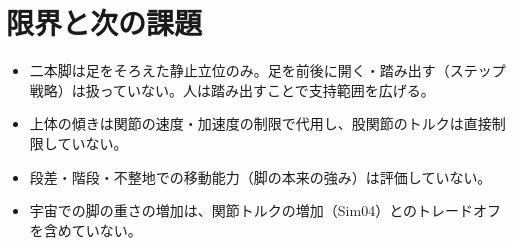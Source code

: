 \section{限界と次の課題}

\begin{itemize}
\tightlist
\item
  二本脚は足をそろえた静止立位のみ。足を前後に開く・踏み出す（ステップ戦略）は扱っていない。人は踏み出すことで支持範囲を広げる。
\item
  上体の傾きは関節の速度・加速度の制限で代用し、股関節のトルクは直接制限していない。
\item
  段差・階段・不整地での移動能力（脚の本来の強み）は評価していない。
\item
  宇宙での脚の重さの増加は、関節トルクの増加（Sim04）とのトレードオフを含めていない。
\end{itemize}
